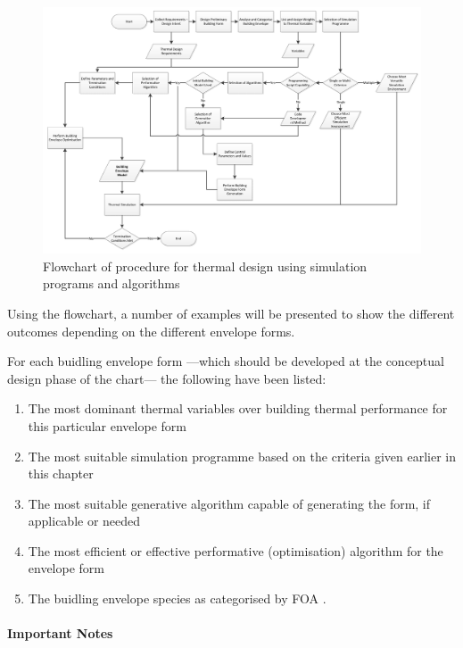 \begin{figure}
	\centering
	\includegraphics[width=21cm]{./Images/9-Flowchart}
	\caption[Thermal Algorithmic Design Flowchart]{Flowchart of procedure for thermal design using simulation programs and algorithms}
	\label{fig:Ch5Flowchart}
\end{figure}

Using the flowchart, a number of examples will be presented to show the different outcomes depending on the different envelope forms.

For each buidling envelope form ---which should be developed at the conceptual design phase of the chart--- the following have been listed:

\begin{enumerate}
	\item The most dominant thermal variables over building thermal performance for this particular envelope form
	\item The most suitable simulation programme based on the criteria given earlier in this chapter
	\item The most suitable generative algorithm capable of generating the form, if applicable or needed
	\item The most efficient or effective performative (optimisation) algorithm for the envelope form
	\item The buidling envelope species as categorised by FOA \cite{foa04}.
\end{enumerate}

\paragraph{Important Notes}\mbox{}

